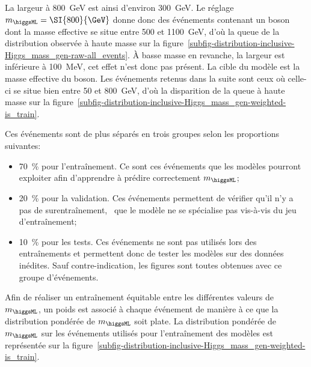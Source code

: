 La largeur à \SI{800}{\GeV} est ainsi d'environ \SI{300}{\GeV}.
Le réglage $m_{\higgsML} = \SI{800}{\GeV}$ donne donc des événements contenant un boson dont la masse effective se situe entre \num{500} et \SI{1100}{\GeV}, d'où la queue de la distribution observée à haute masse sur la figure~\ref{subfig-distribution-inclusive-Higgs_mass_gen-raw-all_events}.
À basse masse en revanche, la largeur est inférieure à \SI{100}{\MeV}, cet effet n'est donc pas présent.
La cible du modèle est la masse effective du boson.
Les événements retenus dans la suite sont ceux où celle-ci se situe bien entre \num{50} et \SI{800}{\GeV},
d'où la disparition de la queue à haute masse sur la figure~\ref{subfig-distribution-inclusive-Higgs_mass_gen-weighted-is_train}.
\par
Ces événements sont de plus séparés en trois groupes selon les proportions suivantes:
\begin{itemize}
\item \SI{70}{\%} pour l'entraînement. Ce sont ces événements que les modèles pourront exploiter afin d'apprendre à prédire correctement $m_{\higgsML}$;
\item \SI{20}{\%} pour la validation. Ces événements permettent de vérifier qu'il n'y a pas de surentraînement, \ie\ que le modèle ne se spécialise pas vis-à-vis du jeu d'entraînement;
\item \SI{10}{\%} pour les tests. Ces événements ne sont pas utilisés lors des entraînements et permettent donc de tester les modèles sur des données inédites. Sauf contre-indication, les figures sont toutes obtenues avec ce groupe d'événements.
\end{itemize}
\par
Afin de réaliser un entraînement équitable entre les différentes valeurs de $m_{\higgsML}$, un poids est associé à chaque événement de manière à ce que la distribution pondérée de $m_{\higgsML}$ soit plate.
La distribution pondérée de $m_{\higgsML}$ sur les événements utilisés pour l'entraînement des modèles est représentée sur la figure~\ref{subfig-distribution-inclusive-Higgs_mass_gen-weighted-is_train}.
